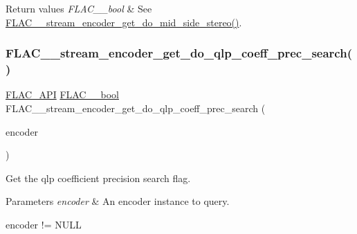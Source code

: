 \begin{DoxyRetVals}{Return values}
{\em F\+L\+A\+C\+\_\+\+\_\+bool} & See \hyperlink{group__flac__stream__encoder_ga3308e73db9d0ae4803485c35d2a54a2d}{F\+L\+A\+C\+\_\+\+\_\+stream\+\_\+encoder\+\_\+get\+\_\+do\+\_\+mid\+\_\+side\+\_\+stereo()}. \\
\hline
\end{DoxyRetVals}
\mbox{\label{group__flac__stream__encoder_gaa258ce03d970b397f5b698c63636d985}} 
\subsubsection{\texorpdfstring{F\+L\+A\+C\+\_\+\+\_\+stream\+\_\+encoder\+\_\+get\+\_\+do\+\_\+qlp\+\_\+coeff\+\_\+prec\+\_\+search()}{FLAC\_\_stream\_encoder\_get\_do\_qlp\_coeff\_prec\_search()}}
{\footnotesize\ttfamily \hyperlink{group__flac__export_ga56ca07df8a23310707732b1c0007d6f5}{F\+L\+A\+C\+\_\+\+A\+PI} \hyperlink{ordinals_8h_a95103469f1cbd78b8cf250194985b34e}{F\+L\+A\+C\+\_\+\+\_\+bool} F\+L\+A\+C\+\_\+\+\_\+stream\+\_\+encoder\+\_\+get\+\_\+do\+\_\+qlp\+\_\+coeff\+\_\+prec\+\_\+search (\begin{DoxyParamCaption}\item[{\hyperlink{zconf_8h_a2c212835823e3c54a8ab6d95c652660e}{const} \hyperlink{struct_f_l_a_c_____stream_encoder}{F\+L\+A\+C\+\_\+\+\_\+\+Stream\+Encoder} $\ast$}]{encoder }\end{DoxyParamCaption})}

Get the qlp coefficient precision search flag.


\begin{DoxyParams}{Parameters}
{\em encoder} & An encoder instance to query.  
\begin{DoxyCode}
encoder != NULL 
\end{DoxyCode}
 \\
\hline
\end{DoxyParams}

